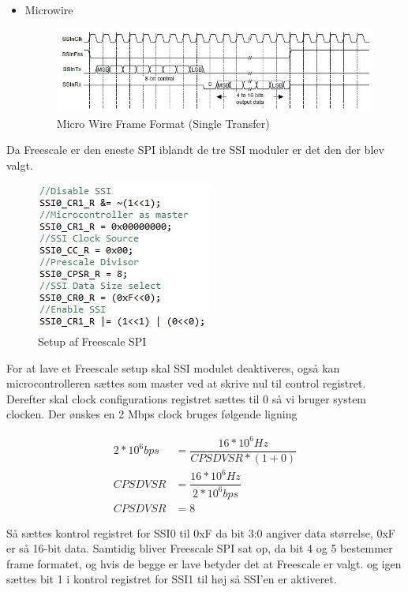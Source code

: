 \begin{itemize}
	\item Microwire
		\begin{figure}[ht]
			\begin{center}
			\includegraphics[scale=0.8]{Billeder/MW_Frame_format.jpg}
			\end{center}
			\caption{Micro Wire Frame Format (Single Transfer)}
			\label{fig:MWFrameFormat}
		\end{figure}
\end{itemize}

Da Freescale er den eneste SPI iblandt de tre SSI moduler er det den der blev valgt.

		\begin{figure}[ht]
			\begin{center}
			\includegraphics[scale=0.8]{Billeder/Spi_Setup.jpg}
			\end{center}
			\label{fig:SPI_Setup}
			\caption{Setup af Freescale SPI}
		\end{figure}

For at lave et Freescale setup skal SSI modulet deaktiveres, også kan microcontrolleren sættes som master ved at skrive nul til control registret.
Derefter skal clock configurations registret sættes til 0 så vi bruger system clocken.
Der ønskes en 2 Mbps clock bruges følgende ligning

\begin{align*}
2*10^6 bps &= \dfrac{16*10^6 Hz}{CPSDVSR * (1 + 0)}\\
CPSDVSR &= \dfrac{16*10^6 Hz}{2*10^6 bps}\\
CPSDVSR &= 8
\end{align*}

Så sættes kontrol registret for SSI0 til 0xF da bit 3:0 angiver data størrelse, 0xF er så 16-bit data. Samtidig bliver Freescale SPI sat op, da bit 4 og 5 bestemmer frame formatet, og hvis de begge er lave betyder det at Freescale er valgt. 
og igen sættes bit 1 i kontrol registret for SSI1 til høj så SSI'en er aktiveret.

